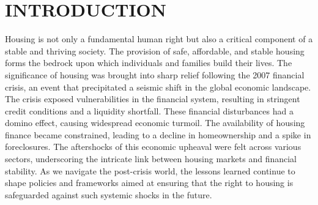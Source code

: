 \documentclass{aip-cp}
\begin{document}
\section{INTRODUCTION}

Housing is not only a fundamental human right but also a critical component of a stable and thriving society. The provision of safe, affordable, and stable housing forms the bedrock upon which individuals and families build their lives. The significance of housing was brought into sharp relief following the 2007 financial crisis, an event that precipitated a seismic shift in the global economic landscape. The crisis exposed vulnerabilities in the financial system, resulting in stringent credit conditions and a liquidity shortfall. These financial disturbances had a domino effect, causing widespread economic turmoil. The availability of housing finance became constrained, leading to a decline in homeownership and a spike in foreclosures. The aftershocks of this economic upheaval were felt across various sectors, underscoring the intricate link between housing markets and financial stability. As we navigate the post-crisis world, the lessons learned continue to shape policies and frameworks aimed at ensuring that the right to housing is safeguarded against such systemic shocks in the future.
\end{document}
